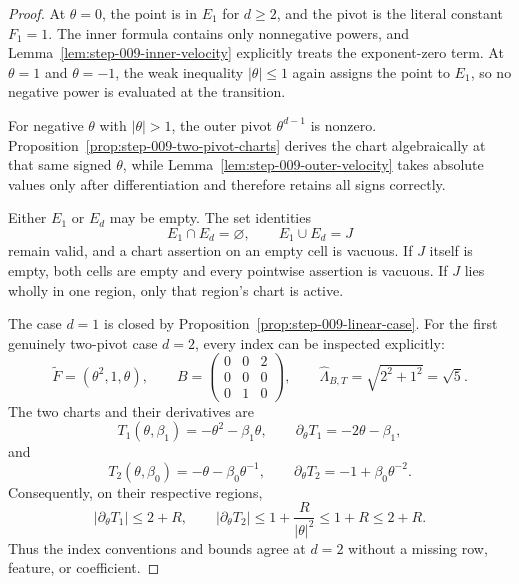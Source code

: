 \begin{proof}
At \(\theta=0\), the point is in \(E_1\) for \(d\geq2\), and the pivot is the literal constant \(F_1=1\). The inner formula contains only nonnegative powers, and Lemma~\ref{lem:step-009-inner-velocity} explicitly treats the exponent-zero term. At \(\theta=1\) and \(\theta=-1\), the weak inequality \(\lvert\theta\rvert\leq1\) again assigns the point to \(E_1\), so no negative power is evaluated at the transition.

For negative \(\theta\) with \(\lvert\theta\rvert>1\), the outer pivot \(\theta^{d-1}\) is nonzero. Proposition~\ref{prop:step-009-two-pivot-charts} derives the chart algebraically at that same signed \(\theta\), while Lemma~\ref{lem:step-009-outer-velocity} takes absolute values only after differentiation and therefore retains all signs correctly.

Either \(E_1\) or \(E_d\) may be empty. The set identities
\begin{equation}
\label{eq:appendix-display-304}
E_1\cap E_d=\varnothing,
\qquad
E_1\cup E_d=J
\end{equation}
remain valid, and a chart assertion on an empty cell is vacuous. If \(J\) itself is empty, both cells are empty and every pointwise assertion is vacuous. If \(J\) lies wholly in one region, only that region's chart is active.

The case \(d=1\) is closed by Proposition~\ref{prop:step-009-linear-case}. For the first genuinely two-pivot case \(d=2\), every index can be inspected explicitly:
\begin{equation}
\label{eq:appendix-display-305}
\widetilde F=(\theta^2,1,\theta),
\qquad
B=\begin{pmatrix}
0&0&2\\
0&0&0\\
0&1&0
\end{pmatrix},
\qquad
\widehat\Lambda_{B,T}=\sqrt{2^2+1^2}=\sqrt5.
\end{equation}
The two charts and their derivatives are
\begin{equation}
\label{eq:appendix-display-306}
T_1(\theta,\beta_1)=-\theta^2-\beta_1\theta,
\qquad
\partial_\theta T_1=-2\theta-\beta_1,
\end{equation}
and
\begin{equation}
\label{eq:appendix-display-307}
T_2(\theta,\beta_0)=-\theta-\beta_0\theta^{-1},
\qquad
\partial_\theta T_2=-1+\beta_0\theta^{-2}.
\end{equation}
Consequently, on their respective regions,
\begin{equation}
\label{eq:appendix-display-308}
\lvert\partial_\theta T_1\rvert\leq2+R,
\qquad
\lvert\partial_\theta T_2\rvert
\leq1+\frac{R}{\lvert\theta\rvert^2}
\leq1+R
\leq2+R.
\end{equation}
Thus the index conventions and bounds agree at \(d=2\) without a missing row, feature, or coefficient.


\end{proof}

